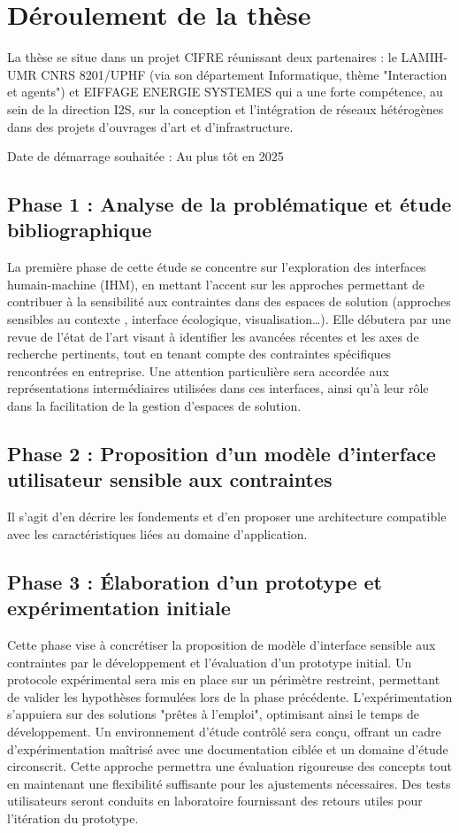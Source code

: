 \documentclass[a4paper,12pt]{article}
\begin{document}
\section{Déroulement de la thèse}
\label{sec:orgfeae1cf}
La thèse se situe dans un projet CIFRE réunissant deux partenaires : le LAMIH-UMR CNRS 8201/UPHF (via son département Informatique, thème "Interaction et agents") et EIFFAGE ENERGIE SYSTEMES qui a une forte compétence, au sein de la direction I2S, sur la conception et l'intégration de réseaux hétérogènes dans des projets d'ouvrages d'art et d'infrastructure.


Date de démarrage souhaitée : Au plus tôt en 2025
\subsection{Phase 1 : Analyse de la problématique et étude bibliographique}
\label{sec:org990b053}
La première phase de cette étude se concentre sur l'exploration des interfaces humain-machine (IHM), en mettant l'accent sur  les approches permettant de contribuer à la sensibilité aux contraintes dans des espaces de solution (approches sensibles au contexte \autocite{anindk.deySituatedInteractionContextAware2001}, interface écologique, visualisation\ldots{}). Elle débutera par une revue de l'état de l'art visant à identifier les avancées récentes et les axes de recherche pertinents, tout en tenant compte des contraintes spécifiques rencontrées en entreprise. Une attention particulière sera accordée aux représentations intermédiaires utilisées dans ces interfaces, ainsi qu'à leur rôle dans la facilitation de la gestion d'espaces de solution. 
\subsection{Phase 2 : Proposition d'un modèle d'interface utilisateur sensible aux contraintes}
\label{sec:org75fa9e4}
Il s'agit d'en décrire les fondements et d'en proposer une architecture compatible avec les caractéristiques liées au domaine d'application.
\subsection{Phase 3 : Élaboration d'un prototype et expérimentation initiale}
\label{sec:org09832fa}
Cette phase vise à concrétiser la proposition de modèle d'interface sensible aux contraintes par le développement et l'évaluation d'un prototype initial. Un protocole expérimental sera mis en place sur un périmètre restreint, permettant de valider les hypothèses formulées lors de la phase précédente. L'expérimentation s'appuiera sur des solutions "prêtes à l'emploi", optimisant ainsi le temps de développement. Un environnement d'étude contrôlé sera conçu, offrant un cadre d'expérimentation maîtrisé avec une documentation ciblée et un domaine d'étude circonscrit. Cette approche permettra une évaluation rigoureuse des concepts tout en maintenant une flexibilité suffisante pour les ajustements nécessaires. Des tests utilisateurs seront conduits en laboratoire fournissant des retours utiles pour l'itération du prototype.
\end{document}
